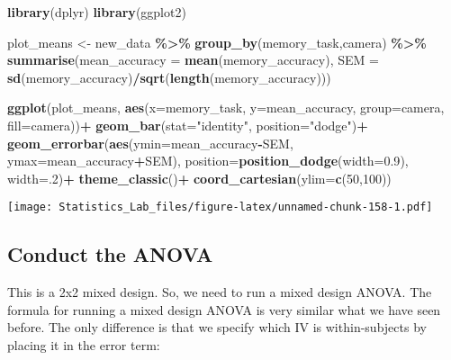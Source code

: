 \documentclass[
]{book}
\newenvironment{Shaded}{\begin{snugshade}}{\end{snugshade}}
\newcommand{\AttributeTok}[1]{\textcolor[rgb]{0.13,0.29,0.53}{#1}}
\newcommand{\DecValTok}[1]{\textcolor[rgb]{0.00,0.00,0.81}{#1}}
\newcommand{\FloatTok}[1]{\textcolor[rgb]{0.00,0.00,0.81}{#1}}
\newcommand{\FunctionTok}[1]{\textcolor[rgb]{0.13,0.29,0.53}{\textbf{#1}}}
\newcommand{\NormalTok}[1]{#1}
\newcommand{\OtherTok}[1]{\textcolor[rgb]{0.56,0.35,0.01}{#1}}
\newcommand{\SpecialCharTok}[1]{\textcolor[rgb]{0.81,0.36,0.00}{\textbf{#1}}}
\newcommand{\StringTok}[1]{\textcolor[rgb]{0.31,0.60,0.02}{#1}}
\begin{document}
\begin{Shaded}
\begin{Highlighting}[]
\FunctionTok{library}\NormalTok{(dplyr)}
\FunctionTok{library}\NormalTok{(ggplot2)}

\NormalTok{plot\_means }\OtherTok{\textless{}{-}}\NormalTok{ new\_data }\SpecialCharTok{\%\textgreater{}\%}
            \FunctionTok{group\_by}\NormalTok{(memory\_task,camera) }\SpecialCharTok{\%\textgreater{}\%}
            \FunctionTok{summarise}\NormalTok{(}\AttributeTok{mean\_accuracy =} \FunctionTok{mean}\NormalTok{(memory\_accuracy),}
                      \AttributeTok{SEM =} \FunctionTok{sd}\NormalTok{(memory\_accuracy)}\SpecialCharTok{/}\FunctionTok{sqrt}\NormalTok{(}\FunctionTok{length}\NormalTok{(memory\_accuracy)))}

\FunctionTok{ggplot}\NormalTok{(plot\_means, }\FunctionTok{aes}\NormalTok{(}\AttributeTok{x=}\NormalTok{memory\_task, }\AttributeTok{y=}\NormalTok{mean\_accuracy, }\AttributeTok{group=}\NormalTok{camera, }\AttributeTok{fill=}\NormalTok{camera))}\SpecialCharTok{+}
  \FunctionTok{geom\_bar}\NormalTok{(}\AttributeTok{stat=}\StringTok{"identity"}\NormalTok{, }\AttributeTok{position=}\StringTok{"dodge"}\NormalTok{)}\SpecialCharTok{+}
  \FunctionTok{geom\_errorbar}\NormalTok{(}\FunctionTok{aes}\NormalTok{(}\AttributeTok{ymin=}\NormalTok{mean\_accuracy}\SpecialCharTok{{-}}\NormalTok{SEM, }\AttributeTok{ymax=}\NormalTok{mean\_accuracy}\SpecialCharTok{+}\NormalTok{SEM), }
                \AttributeTok{position=}\FunctionTok{position\_dodge}\NormalTok{(}\AttributeTok{width=}\FloatTok{0.9}\NormalTok{),}
                \AttributeTok{width=}\NormalTok{.}\DecValTok{2}\NormalTok{)}\SpecialCharTok{+}
  \FunctionTok{theme\_classic}\NormalTok{()}\SpecialCharTok{+}
  \FunctionTok{coord\_cartesian}\NormalTok{(}\AttributeTok{ylim=}\FunctionTok{c}\NormalTok{(}\DecValTok{50}\NormalTok{,}\DecValTok{100}\NormalTok{))}
\end{Highlighting}
\end{Shaded}

\texttt{[image: Statistics\_Lab\_files/figure-latex/unnamed-chunk-158-1.pdf]}

\hypertarget{conduct-the-anova-2}{%
\subsection{Conduct the ANOVA}\label{conduct-the-anova-2}}

This is a 2x2 mixed design. So, we need to run a mixed design ANOVA. The
formula for running a mixed design ANOVA is very similar what we have
seen before. The only difference is that we specify which IV is
within-subjects by placing it in the error term:
\end{document}
